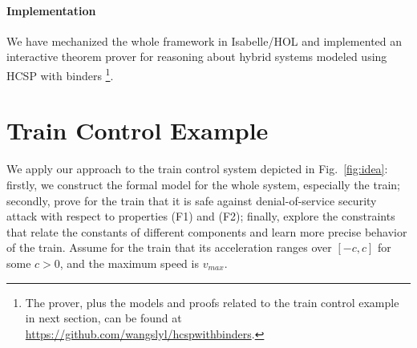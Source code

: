 \documentclass{llncs}
\begin{document}
\paragraph{\textbf{Implementation}}
We have mechanized the whole framework  in Isabelle/HOL and implemented an interactive theorem prover for
reasoning about hybrid systems modeled using HCSP with binders \footnote{The prover, plus the models and proofs related to the train control example in next section,  can be found at \url{https://github.com/wangslyl/hcspwithbinders}.}.




\section{Train Control Example}
\label{sec:application}
We apply our approach to the train control system  depicted in Fig.~\ref{fig:idea}: firstly, we
construct the formal model for the whole system, especially the train;
secondly,  prove for the train that it is safe against denial-of-service security attack  with respect
to properties (F1) and (F2); finally, explore  the constraints that
relate the constants of different components and learn more precise behavior of
the train.
Assume for the train that
its acceleration ranges over $[-c, c]$ for some $c>0$, and the maximum speed
is  $v_{max}$.
\end{document}
